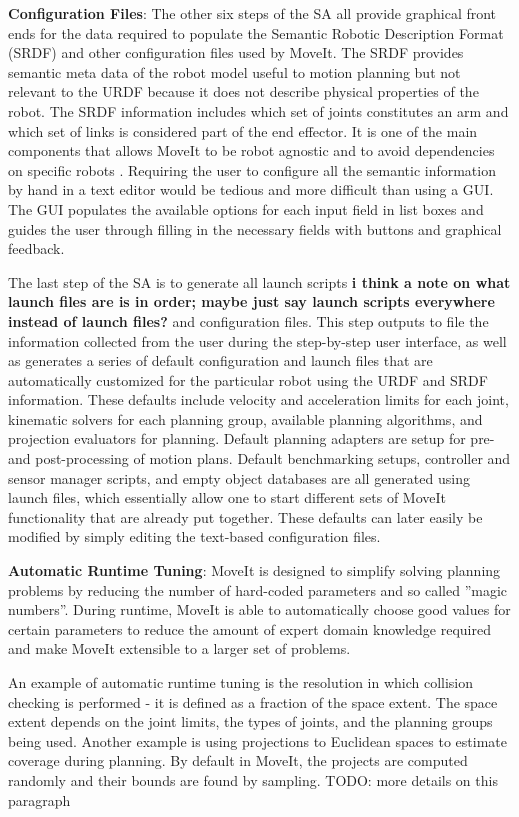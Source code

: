 \documentclass[10pt,journal,compsoc]{joser1}
\begin{document}
{{\bf Configuration Files}: The other six steps of the SA all provide graphical front ends for the data required to populate the Semantic Robotic Description Format (SRDF) and other configuration files used by MoveIt. The SRDF provides semantic meta data of the robot model useful to motion planning but not relevant to the URDF because it does not describe physical properties of the robot. The SRDF information includes which set of joints constitutes an arm and which set of links is considered part of the end effector. It is one of the main components that allows MoveIt to be robot agnostic and to avoid dependencies on specific robots \cite{moveit}. Requiring the user to configure all the semantic information by hand in a text editor would be tedious and more difficult than using a GUI. The GUI populates the available options for each input field in list boxes and guides the user through filling in the necessary fields with buttons and graphical feedback.

The last step of the SA is to generate all launch scripts \textbf{i think a note on what launch files are is in order; maybe just say launch scripts everywhere instead of launch files?} and configuration files. This step outputs to file the information collected from the user during the step-by-step user interface, as well as generates a series of default configuration and launch files that are automatically customized for the particular robot using the URDF and SRDF information. These defaults include velocity and acceleration limits for each joint, kinematic solvers for each planning group, available planning algorithms, and projection evaluators for planning. Default planning adapters are setup for pre- and post-processing of motion plans. Default benchmarking setups, controller and sensor manager scripts, and empty object databases are all generated using launch files, which essentially allow one to start different sets of MoveIt functionality that are already put together. These defaults can later easily be modified by simply editing the text-based configuration files.

{\bf Automatic Runtime Tuning}: MoveIt is designed to simplify solving planning problems by reducing the number of hard-coded parameters and so called ''magic numbers''. During runtime, MoveIt is able to automatically choose good values for certain parameters to reduce the amount of expert domain knowledge required and make MoveIt extensible to a larger set of problems. 

An example of automatic runtime tuning is the resolution in which collision checking is performed - it is defined as a fraction of the space extent. The space extent depends on the joint limits, the types of joints, and the planning groups being used. Another example is using projections to Euclidean spaces to estimate coverage during planning. By default in MoveIt, the projects are computed randomly and their bounds are found by sampling. TODO: more details on this paragraph

}
\end{document}
